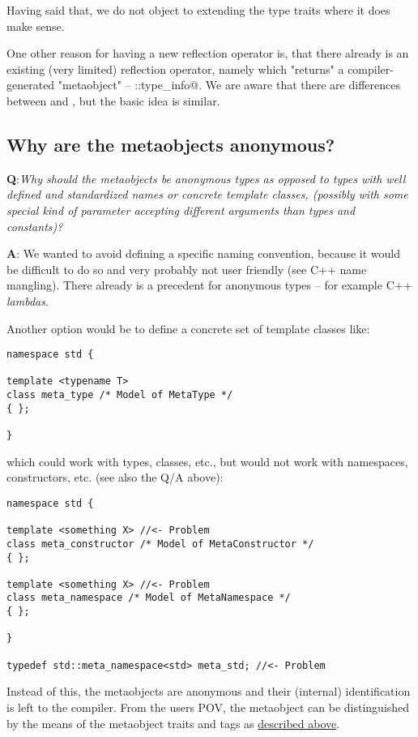 Having said that, we do not object to extending the type traits where it does make sense.

One other reason for having a new reflection operator is, that there already is an
existing (very limited) reflection operator, namely \verb@typeid@ which "returns"
a compiler-generated "metaobject" -- \verb@std::type_info@. We are aware that there
are differences between \verb@typeid@ and \verb@mirrored@, but the basic idea is similar.

\subsection{Why are the metaobjects anonymous?}

{\textbf Q:}{\em Why should the metaobjects be anonymous types as opposed to
types with well defined and standardized names or concrete template classes, (possibly with some
special kind of parameter accepting different arguments than types and constants)?}

{\textbf A:} We wanted to avoid defining a specific naming convention, because it would
be difficult to do so and very probably not user friendly (see C++ name mangling). There
already is a precedent for anonymous types -- for example C++ {\em lambdas}.

Another option would be to define a concrete set of template classes like:

\begin{verbatim}
namespace std {

template <typename T>
class meta_type /* Model of MetaType */
{ };

}
\end{verbatim}

which could work with types, classes, etc., but would not work with namespaces, constructors,
etc. (see also the Q/A above):

\begin{verbatim}
namespace std {

template <something X> //<- Problem
class meta_constructor /* Model of MetaConstructor */
{ };

template <something X> //<- Problem
class meta_namespace /* Model of MetaNamespace */
{ };

}

typedef std::meta_namespace<std> meta_std; //<- Problem
\end{verbatim}

Instead of this, the metaobjects are anonymous and their (internal) identification
is left to the compiler. From the users POV, the metaobject can be distinguished
by the means of the metaobject traits and tags as \hyperref[section-Concepts]{described above}.

